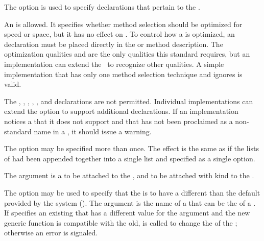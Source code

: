 \itemitem{\bull}
The  option is used to specify declarations that pertain
to the .

An   is allowed.
It specifies whether method selection should be optimized for 
speed or space, but it has no effect on .
To control how a  is optimized, an 
declaration must be placed directly in the  
or method description.  The optimization qualities  and
 are the only qualities this standard requires, but an
implementation can extend the \CLOS\ to recognize other qualities.  
A simple implementation that has only one method selection technique 
and ignores   is valid.
 
The , , , ,
, and  declarations are not permitted.
Individual implementations can extend the  option to
support additional declarations.
If an implementation notices a  that it does
not support and that has not been proclaimed as a non-standard 
 name in a  , 
it should issue a warning. 

The  option may be specified more than once.
The effect is the same as if the lists of  
had been appended together into a single list and specified as a 
single  option.

\itemitem{\bull} 
The  argument is a 
to be attached to the  , 
and to be attached with kind  to the .
 
\itemitem{\bull} 
The  option may be used to specify that
the  is to have a different  than
the default provided by the system ().
The  argument is the name of a  that can be the
 of a .  If  specifies
an existing  that has a different value for the
 argument and the new generic function 
 is compatible with the old,  is called 
to change the  of the ; 
otherwise an error is signaled.
 
